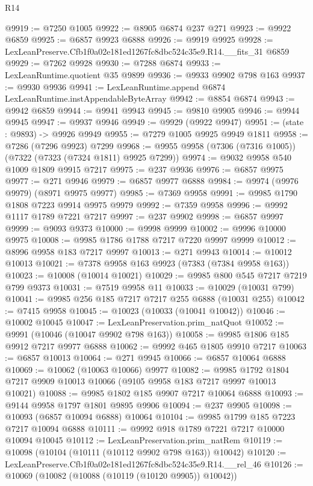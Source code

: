 \begin{lexlean}{R14}
\begin{coremodule}
@9919 := @7250 @1005
@9922 := @8905 @6874 @237 @271
@9923 := @9922 @6859
@9925 := @6857 @9923 @6888
@9926 := @9919 @9925
@9928 := LexLeanPreserve.Cfb1f0a02e181ed1267fc8dbc524c35e9.R14.__fits_31 @6859
@9929 := @7262 @9928
@9930 := @7288 @6874
@9933 := LexLeanRuntime.quotient @35 @9899
@9936 := @9933 @9902 @798 @163
@9937 := @9930 @9936
@9941 := LexLeanRuntime.append @6874 LexLeanRuntime.instAppendableByteArray
@9942 := @8854 @6874
@9943 := @9942 @6859
@9944 := @9941 @9943
@9945 := @9810 @9905
@9946 := @9944 @9945
@9947 := @9937 @9946
@9949 := @9929 (@9922 @9947)
@9951 := (state : @9893) -> @9926 @9949
@9955 := @7279 @1005 @9925 @9949 @1811
@9958 := @7286 (@7296 @9923) @7299
@9968 := @9955 @9958 (@7306 (@7316 @1005)) (@7322 (@7323 (@7324 @1811) @9925 @7299))
@9974 := @9032 @9958 @540 @1009 @1809 @9915 @7217
@9975 := @237 @9936
@9976 := @6857 @9975
@9977 := @271 @9946
@9979 := @6857 @9977 @6888
@9984 := @9974 (@9976 @9979) (@8971 @9975 @9977)
@9985 := @7369 @9958
@9991 := @9985 @1790 @1808 @7223 @9914 @9975 @9979
@9992 := @7359 @9958
@9996 := @9992 @1117 @1789 @7221 @7217
@9997 := @237 @9902
@9998 := @6857 @9997
@9999 := @9093 @9373
@10000 := @9998 @9999
@10002 := @9996 @10000 @9975
@10008 := @9985 @1786 @1788 @7217 @7220 @9997 @9999
@10012 := @8996 @9958 @183 @7217 @9997
@10013 := @271 @9943
@10014 := @10012 @10013
@10021 := @7378 @9958 @163 @9923 (@7383 (@7384 @9958 @163))
@10023 := @10008 (@10014 @10021)
@10029 := @9985 @800 @545 @7217 @7219 @799 @9373
@10031 := @7519 @9958 @11
@10033 := @10029 (@10031 @799)
@10041 := @9985 @256 @185 @7217 @7217 @255 @6888 (@10031 @255)
@10042 := @7415 @9958
@10045 := @10023 (@10033 (@10041 @10042))
@10046 := @10002 @10045
@10047 := LexLeanPreservation.prim_natQuot
@10052 := @9991 (@10046 (@10047 @9902 @798 @163))
@10058 := @9985 @1806 @185 @9912 @7217 @9977 @6888
@10062 := @9992 @465 @1805 @9910 @7217
@10063 := @6857 @10013
@10064 := @271 @9945
@10066 := @6857 @10064 @6888
@10069 := @10062 (@10063 @10066) @9977
@10082 := @9985 @1792 @1804 @7217 @9909 @10013 @10066 (@9105 @9958 @183 @7217 @9997 @10013 @10021)
@10088 := @9985 @1802 @185 @9907 @7217 @10064 @6888
@10093 := @9144 @9958 @1797 @1801 @9895 @9906
@10094 := @237 @9905
@10098 := @10093 (@6857 @10094 @6888) @10064
@10104 := @9985 @1799 @185 @7223 @7217 @10094 @6888
@10111 := @9992 @918 @1789 @7221 @7217 @10000 @10094 @10045
@10112 := LexLeanPreservation.prim_natRem
@10119 := @10098 (@10104 (@10111 (@10112 @9902 @798 @163)) @10042)
@10120 := LexLeanPreserve.Cfb1f0a02e181ed1267fc8dbc524c35e9.R14.__rel_46
@10126 := @10069 (@10082 (@10088 (@10119 (@10120 @9905)) @10042))

\end{coremodule}
\end{lexlean}

